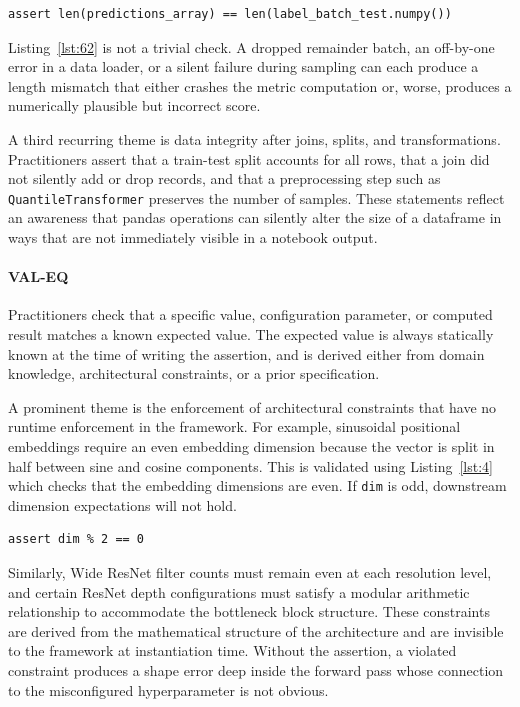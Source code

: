 \begin{lstlisting}[caption={}, label={lst:62}]
assert len(predictions_array) == len(label_batch_test.numpy())
\end{lstlisting}

Listing~\ref{lst:62} is not a trivial check.
A dropped remainder batch,
an off-by-one error in a data loader,
or a silent failure during sampling
can each produce a length mismatch that either crashes the metric computation
or, worse, produces a numerically plausible but incorrect score.

A third recurring theme is data integrity after joins, splits, and transformations.
Practitioners assert that a train-test split accounts for all rows,
that a join did not silently add or drop records,
and that a preprocessing step such as \lstinline{QuantileTransformer} preserves the number of samples.
These statements reflect an awareness
that pandas operations can silently alter the size of a dataframe
in ways that are not immediately visible in a notebook output.

\paragraph{VAL-EQ}

Practitioners check that a specific value, configuration parameter, or computed result
matches a known expected value.
The expected value is always statically known at the time of writing the assertion,
and is derived either from domain knowledge, architectural constraints, or a prior specification.

A prominent theme is the enforcement of architectural constraints
that have no runtime enforcement in the framework.
For example, sinusoidal positional embeddings
require an even embedding dimension
because the vector is split in half between sine and cosine components.
This is validated using Listing~\ref{lst:4}
which checks that the embedding dimensions are even.
If \lstinline{dim} is odd, downstream dimension expectations will not hold.

\begin{lstlisting}[caption={}, label={lst:4}]
assert dim % 2 == 0
\end{lstlisting}

Similarly, Wide ResNet filter counts must remain even at each resolution level,
and certain ResNet depth configurations
must satisfy a modular arithmetic relationship
to accommodate the bottleneck block structure.
These constraints are derived from the mathematical structure of the architecture
and are invisible to the framework at instantiation time.
Without the assertion,
a violated constraint produces a shape error
deep inside the forward pass whose connection to the misconfigured hyperparameter is not obvious.

